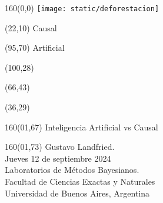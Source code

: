 \documentclass[shownotes,aspectratio=169]{beamer}
\begin{document}
\color{black!85}
\large

\begin{frame}


\begin{textblock}{160}(0,0)
\texttt{[image: static/deforestacion]}
\end{textblock}

\begin{textblock}{80}(22,10)
\textcolor{black!15}{\fontsize{44}{55}\selectfont Causal}
\end{textblock}

\begin{textblock}{47}(95,70)
\centering \textcolor{black!15}{{\fontsize{52}{65}\selectfont Artificial}}
\end{textblock}

\begin{textblock}{80}(100,28)
\LARGE  \textcolor{black!15}{}
\end{textblock}


\begin{textblock}{80}(66,43)
\LARGE  \textcolor{black!15}{\scalebox{6}{$=$}}
\end{textblock}

\begin{textblock}{80}(36,29)
\LARGE  \textcolor{black!15}{\scalebox{9}{$p$}}
\end{textblock}

 \vspace{2cm}
\maketitle



\begin{textblock}{160}(01,67)
\normalsize \textcolor{black!5}{Inteligencia Artificial vs Causal}
\end{textblock}

\begin{textblock}{160}(01,73)
\scriptsize \textcolor{black!5}{
Gustavo Landfried. \\
Jueves 12 de septiembre 2024 \\
Laboratorios de Métodos Bayesianos. \\
Facultad de Ciencias Exactas y Naturales \\
Universidad de Buenos Aires, Argentina}
\end{textblock}

\end{frame}
\end{document}
